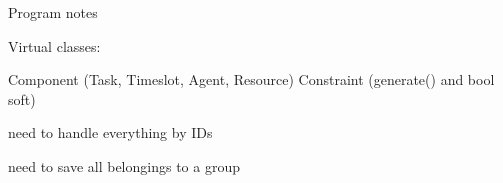 Program notes

Virtual classes:

Component (Task, Timeslot, Agent, Resource)
Constraint (generate() and bool soft)



need to handle everything by IDs

need to save all belongings to a group